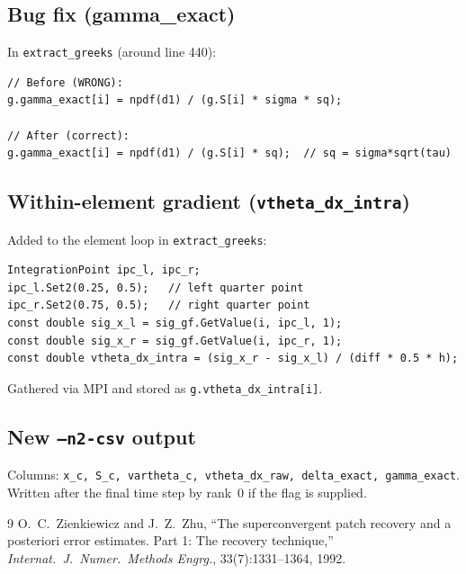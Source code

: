 \documentclass[11pt,a4paper]{article}
\begin{document}
\subsection*{Bug fix (gamma\_exact)}

In \texttt{extract\_greeks} (around line 440):
\begin{verbatim}
// Before (WRONG):
g.gamma_exact[i] = npdf(d1) / (g.S[i] * sigma * sq);

// After (correct):
g.gamma_exact[i] = npdf(d1) / (g.S[i] * sq);  // sq = sigma*sqrt(tau)
\end{verbatim}

\subsection*{Within-element gradient (\texttt{vtheta\_dx\_intra})}

Added to the element loop in \texttt{extract\_greeks}:
\begin{verbatim}
IntegrationPoint ipc_l, ipc_r;
ipc_l.Set2(0.25, 0.5);   // left quarter point
ipc_r.Set2(0.75, 0.5);   // right quarter point
const double sig_x_l = sig_gf.GetValue(i, ipc_l, 1);
const double sig_x_r = sig_gf.GetValue(i, ipc_r, 1);
const double vtheta_dx_intra = (sig_x_r - sig_x_l) / (diff * 0.5 * h);
\end{verbatim}
Gathered via MPI and stored as \texttt{g.vtheta\_dx\_intra[i]}.

\subsection*{New \texttt{--n2-csv} output}

Columns: \texttt{x\_c, S\_c, vartheta\_c, vtheta\_dx\_raw, delta\_exact, gamma\_exact}.\\
Written after the final time step by rank~0 if the flag is supplied.

\begin{thebibliography}{9}
O.~C.~Zienkiewicz and J.~Z.~Zhu,
``The superconvergent patch recovery and a posteriori error estimates.
Part 1: The recovery technique,''
\textit{Internat.\ J.\ Numer.\ Methods Engrg.}, 33(7):1331--1364, 1992.
\end{thebibliography}
\end{document}
